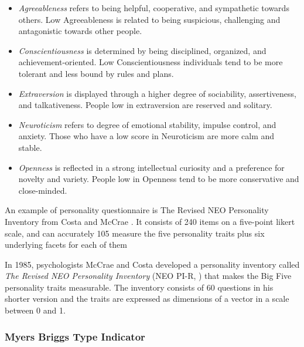 \documentclass[b5paper,10pt,twoside,cucitura]{toptesi}
\begin{document}
\begin{itemize}

    \item \textit{Agreeableness} refers to being helpful, cooperative, and sympathetic towards others. Low Agreeableness is related to being suspicious, challenging and antagonistic towards other people.
    
    \item \textit{Conscientiousness} is determined by being disciplined, organized, and achievement-oriented. Low Conscientiousness individuals tend to be more tolerant and less bound by rules and plans.
    
    \item \textit{Extraversion} is displayed through a higher degree of sociability, assertiveness, and talkativeness. People low in extraversion are reserved and solitary.
    
    \item \textit{Neuroticism} refers to degree of emotional stability, impulse control, and anxiety. Those who have a low score in Neuroticism are more calm and stable.
    
    \item \textit{Openness} is reflected in a strong intellectual curiosity and a preference for novelty and variety. People low in Openness tend to be more conservative and close-minded.
    
\end{itemize} 

An example of personality questionnaire is The Revised NEO Personality Inventory from Costa and McCrae . It consists of 240 items on a five-point likert scale, and can accurately 105 measure the five personality traits plus six underlying facets for each of them

In 1985, psychologists McCrae and Costa developed a personality inventory called \textit{The Revised NEO Personality Inventory} (NEO PI-R,   \citep{NEOPI-R}) that makes the Big Five personality traits measurable. The inventory consists of 60 questions in his shorter version and the traits are expressed as dimensions of a vector in a scale between 0 and 1. 

\subsubsection{Myers Briggs Type Indicator}
\end{document}
